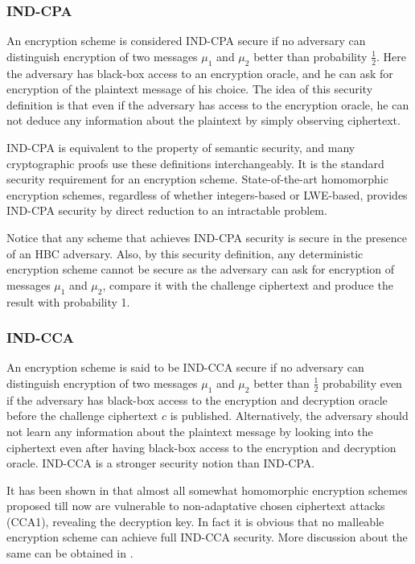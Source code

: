 \subsubsection{IND-CPA} An encryption scheme is considered IND-CPA secure if no adversary can distinguish encryption of two messages $\mu_1$ and $\mu_2$ better than probability $\frac{1}{2}$. Here the adversary has black-box access to an encryption oracle, and he can ask for encryption of the plaintext message of his choice. The idea of this security definition is that even if the adversary has access to the encryption oracle, he can not deduce any information about the plaintext by simply observing ciphertext.

IND-CPA is equivalent to the property of semantic security, and many cryptographic proofs use these definitions interchangeably. It is the standard security requirement for an encryption scheme. State-of-the-art homomorphic encryption schemes, regardless of whether integers-based or LWE-based, provides IND-CPA security by direct reduction to an intractable problem.

Notice that any scheme that achieves IND-CPA security is secure in the presence of an HBC adversary. Also, by this security definition, any deterministic encryption scheme cannot be secure as the adversary can ask for encryption of messages $\mu_1$ and $\mu_2$, compare it with the challenge ciphertext and produce the result with probability 1.

\subsubsection{IND-CCA} An encryption scheme is said to be IND-CCA secure if no adversary can distinguish encryption of two messages $\mu_1$ and $\mu_2$ better than $\frac{1}{2}$ probability even if the adversary has black-box access to the encryption and decryption oracle before the challenge ciphertext $c$ is published. Alternatively, the adversary should not learn any information about the plaintext message by looking into the ciphertext even after having black-box access to the encryption and decryption oracle. IND-CCA is a stronger security notion than IND-CPA.

It has been shown in \cite{loftus2011cca,zhang2012cca,chenal2015key} that almost all somewhat homomorphic encryption schemes proposed till now are vulnerable to non-adaptative chosen ciphertext attacks (CCA1), revealing the decryption key. In fact it is obvious that no malleable encryption scheme can achieve full IND-CCA security. More discussion about the same can be obtained in \cite{bellare1999non}.

